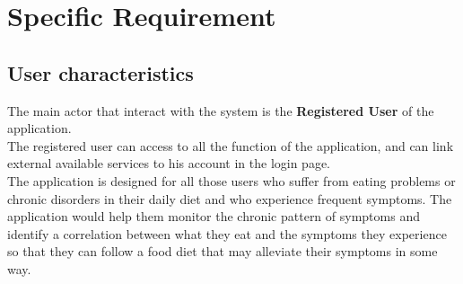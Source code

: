 \documentclass [12pt]{article}
\begin{document}
\section{Specific Requirement}
\subsection{User characteristics}
The main actor that interact with the system is the \textbf{Registered User} of the application.\\
The registered user can access to all the function of the application, and can link external available services to his account in the login page.\\
The application is designed for all those users who suffer from eating problems or chronic disorders in their daily diet and who experience frequent symptoms. The application would help them monitor the chronic pattern of symptoms and identify a correlation between what they eat and the symptoms they experience so that they can follow a food diet that may alleviate their symptoms in some way. 
\end{document}
